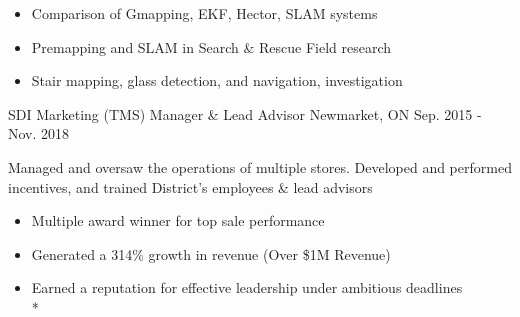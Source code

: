 \begin{cventries}
{\begin{cvitems}
        \begin{itemize}
        		\item Comparison of Gmapping, EKF, Hector, SLAM systems
        		\item Premapping and SLAM in Search \& Rescue Field research
        		\item Stair mapping, glass detection, and navigation, investigation
        		\\
        \end{itemize}
      \end{cvitems}
    }
  \cventry
    {SDI Marketing (TMS)} %
    {Manager \& Lead Advisor} %
    {Newmarket, ON} %
    {Sep. 2015 - Nov. 2018} %
    {
      \begin{cvitems} %
        \item Managed and oversaw the operations of multiple stores. Developed and performed incentives, and trained District’s employees \& lead advisors
        \begin{itemize}
        		\item Multiple award winner for top sale performance
        		\item Generated a 314\% growth in revenue (Over \$1M Revenue)
        		\item Earned a reputation for effective leadership under ambitious deadlines
        		\\*
        \end{itemize}
      \end{cvitems}
    }
    
  \iffalse
  \cventry
    {McMaster University} %
    {Research Participant} %
    {Hamilton, ON} %
    {Jan. 2016 - Sep. 2016} %
    {
      \begin{cvitems} %
        \item Worked with \textbf{Prof. Jamal Deen} to analyze gait kinematics and gait kinetics. This led to a survey on Smart Joint Methods utilizing gyroscopes, force plates, EMG, \& muscle force. Further investigated the Slavelberg, Former-Cordero estimate of 3D ground reaction forces (GRFs), and optimal placement of accelerometers.	
        \begin{itemize}
        		\item Gait analysis, accuracy and reliability of Smart Joint Methods and Optimal Sensors Placement
        		\item  Surveyed the Bro, Intille and Gjoreski approaches based on accelerators, gyroscopes, and force sensors
        \end{itemize}
      \end{cvitems}
    }
    \fi

\end{cventries}
